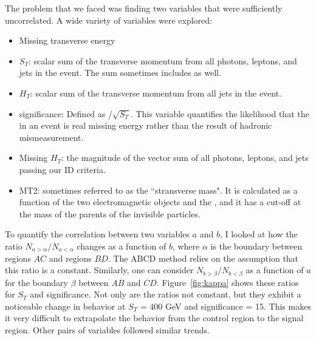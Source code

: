 The problem that we faced was finding two variables that were sufficiently uncorrelated. 
A wide variety of variables were explored:
\begin{itemize}
\item Missing transverse energy \ETmiss
\item $S_T$: scalar sum of the transverse momentum from all photons, leptons, and jets in the event. The sum sometimes includes \ETmiss as well.
\item $H_T$: scalar sum of the transverse momentum from all jets in the event. 
\item \ETmiss significance: Defined as \ETmiss/$\sqrt{S_T}$. This variable quantifies the likelihood that the \ETmiss in an event is real missing energy rather than the result of hadronic mismeasurement. 
\item Missing $H_T$: the magnitude of the vector sum of all photons, leptons, and jets passing our ID criteria.
\item MT2: sometimes referred to as the ``stransverse mass". It is calculated as a function of the two electromagnetic objects and the \ETmiss, and it has a cut-off at the mass of the parents of the invisible particles.
\end{itemize}

To quantify the correlation between two variables $a$ and $b$, I looked at how the ratio 
$N_{a > \alpha}/N_{a < \alpha}$ changes as a function of $b$, where $\alpha$ is the boundary between
regions $AC$ and regions $BD$. The ABCD method relies on the assumption
that this ratio is a constant.
Similarly, one can consider $N_{b > \beta}/N_{b < \beta}$ as a function 
of $a$ for the boundary $\beta$ between $AB$ and $CD$. Figure~\ref{fig:kappa} shows these ratios 
for $S_T$ and \ETmiss significance. Not only are the ratios not constant,
but they exhibit a noticeable change in behavior at $S_T$ = 400 GeV and \ETmiss 
significance = 15. This makes it very difficult to extrapolate the behavior from the control
region to the signal region. Other pairs of variables followed similar trends. 

